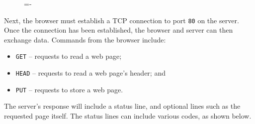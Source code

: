 \documentclass[a4paper]{systems-software}
\begin{document}
\begin{figure}[H]
	\lineskip=-\fboxrule
\end{figure}

Next, the browser must establish a TCP connection to port \texttt{80} on the server. Once the connection has been established, the browser and server can then exchange data. Commands from the browser include:
\begin{itemize}
	\item \texttt{GET} -- requests to read a web page;
	\item \texttt{HEAD} -- requests to read a web page's header; and
	\item \texttt{PUT} -- requests to store a web page.
\end{itemize}

The server's response will include a status line, and optional lines such as the requested page itself. The status lines can include various codes, as shown below.
\end{document}
